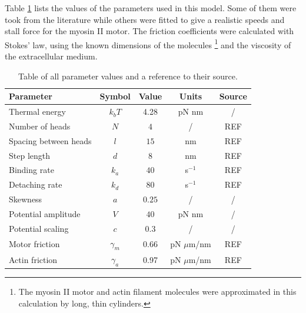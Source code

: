 \documentclass[aps,pre,onecolumn,showpacs,showkeys,a4paper]{revtex4}
\begin{document}
Table \ref{Tab: Parameters} lists the values of the parameters used in this model. 
Some of them were took from the literature while others were fitted to give a realistic speeds and stall force for the myosin II motor. 
The friction coefficients were calculated with Stokes' law, using the known dimensions of the molecules \footnote{The myosin II motor and actin filament molecules were approximated in this calculation by long, thin cylinders.} and the viscosity of the extracellular medium.
\begin{table}[h]
\centering
\begin{tabular}{lcccc}
Parameter & Symbol & Value & Units & Source\\
\hline\hline
Thermal energy & $k_{b}T$ & 4.28 & pN nm & /\\
Number of heads & $N$ & $4$ & / & REF\\
Spacing between heads & $l$ & $15$ & nm & REF\\
Step length & $d$ & $8$ & nm & REF\\
Binding rate & $k_{a}$ & $40$ & s$^{-1}$ & REF\\
Detaching rate & $k_{d}$ & $80$ & s$^{-1}$ & REF\\
Skewness & $a$ & $0.25$ & / & /\\
Potential amplitude & $V$ & $40$ & pN nm & /\\
Potential scaling & $c$ & $0.3$ & / & /\\
Motor friction & $\gamma_{m}$ & 0.66 & pN $\mu$m/nm & REF\\
Actin friction & $\gamma_{a}$ & 0.97 & pN $\mu$m/nm & REF\\
\end{tabular}
\caption{Table of all parameter values and a reference to their source.}
\label{Tab: Parameters}
\end{table}
\end{document}
